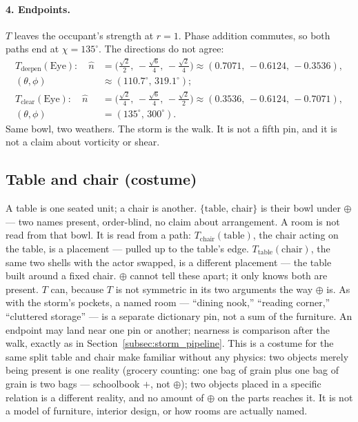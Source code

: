 \documentclass[12pt, a4paper]{article}
\begin{document}
\paragraph{4. Endpoints.}
$T$ leaves the occupant's strength at $r=1$. Phase addition commutes, so
both paths end at $\chi=135^\circ$. The directions do not agree:
\begin{align*}
T_{\mathrm{deepen}}(\mathrm{Eye}):
\quad
\hat n
&= \bigl(\tfrac{\sqrt{2}}{2},\,-\tfrac{\sqrt{6}}{4},\,-\tfrac{\sqrt{2}}{4}\bigr)
\approx (0.7071,\,-0.6124,\,-0.3536),\\
(\theta,\phi)&\approx(110.7^\circ,\,319.1^\circ);\\[0.4em]
T_{\mathrm{clear}}(\mathrm{Eye}):
\quad
\hat n
&= \bigl(\tfrac{\sqrt{2}}{4},\,-\tfrac{\sqrt{6}}{4},\,-\tfrac{\sqrt{2}}{2}\bigr)
\approx (0.3536,\,-0.6124,\,-0.7071),\\
(\theta,\phi)&=(135^\circ,\,300^\circ).
\end{align*}
Same bowl, two weathers. The storm is the walk. It is not a fifth pin,
and it is not a claim about vorticity or shear.

\subsection{Table and chair (costume)}
\label{subsec:table_chair}
A table is one seated unit; a chair is another. $\{\mathrm{table},\,\mathrm{chair}\}$
is their bowl under $\oplus$ --- two names present, order-blind, no
claim about arrangement. A room is not read from that bowl. It is
read from a path: $T_{\mathrm{chair}}(\mathrm{table})$, the chair
acting on the table, is a placement --- pulled up to the table's edge.
$T_{\mathrm{table}}(\mathrm{chair})$, the same two shells with the
actor swapped, is a different placement --- the table built around
a fixed chair. $\oplus$ cannot tell these apart; it only knows both
are present. $T$ can, because $T$ is not symmetric in its two
arguments the way $\oplus$ is. As with the storm's pockets, a named
room --- ``dining nook,'' ``reading corner,'' ``cluttered storage''
--- is a separate dictionary pin, not a sum of the furniture. An
endpoint may land near one pin or another; nearness is comparison
after the walk, exactly as in Section~\ref{subsec:storm_pipeline}.
This is a costume for the same split table and chair make familiar
without any physics: two objects merely being present is one
reality (grocery counting: one bag of grain plus one bag of grain is
two bags --- schoolbook $+$, not $\oplus$); two objects placed
in a specific relation is a different reality, and no amount of
$\oplus$ on the parts reaches it. It is not a model of furniture,
interior design, or how rooms are actually named.
\end{document}
